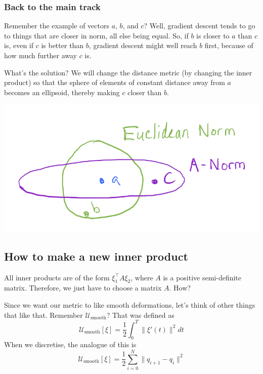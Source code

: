 \documentclass[twoside]{article}
\newcommand{\cus}{\mathcal{U}_\text{smooth}}
\begin{document}
\subsubsection{Back to the main track}
\label{sec:back-main-track}

Remember the example of vectors $a$, $b$, and $c$? Well, gradient descent tends to go to things that are closer in norm, all else being equal. So, if $b$ is closer to $a$ than $c$ is, even if $c$ is better than $b$, gradient descent might well reach $b$ first, because of how much further away $c$ is.

What's the solution? We will change the distance metric (by changing the inner product) so that the sphere of elements of constant distance away from $a$ becomes an ellipsoid, thereby making $c$ closer than $b$.

\begin{center}
\includegraphics[scale=0.3]{figures/balls.png}
\end{center}

\subsection{How to make a new inner product}
\label{sec:how-make-new}

All inner products are of the form $\xi_1^\top A \xi_2$, where $A$ is a positive semi-definite matrix. Therefore, we just have to choose a matrix $A$. How?

Since we want our metric to like smooth deformations, let's think of other things that like that. Remember $\cus$? That was defined as
\begin{equation}
  \label{eq:11}
  \cus[\xi] = \frac{1}{2} \int_0^T \|\xi'(t)\|^2 dt
\end{equation}
When we discretise, the analogue of this is
\begin{equation}
  \cus[\xi] = \frac{1}{2} \sum_{i=0}^N \|q_{i+1} - q_i\|^2\label{eq:12}
\end{equation}
\end{document}
